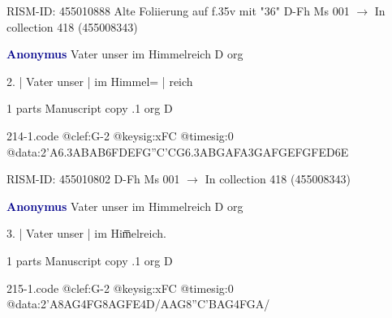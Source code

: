 \documentclass[twocolumn]{book}
\begin{document}
\newline RISM-ID: 455010888
\newline Alte Foliierung auf f.35v mit "36"
\newline D-Fh  Ms 001
\newline $\rightarrow$ In collection 418 (455008343)

\newline \par \vspace{7pt} \textcolor{darkblue}{\textbf{Anonymus  }}
\newline Vater unser im Himmelreich  D  
\newline org
\newline \begin{itshape}[f.2v, at left:] 2. | Vater unser | im Himmel= | reich\end{itshape} 
\newline \textcolor{darkblue}{}  1 parts  
\newline Manuscript copy
.1  org  D  
\begin{filecontents*}{214-1.code}
@clef:G-2
@keysig:xFC
@timesig:0
@data:2'A{6.3ABAB}{6FDEF}{G''C'CG}{6.3ABGA}{FA}{3GAFG}{EFGF}{ED6E}
\end{filecontents*}
\newline
%

\newline RISM-ID: 455010802
\newline D-Fh  Ms 001
\newline $\rightarrow$ In collection 418 (455008343)

\newline \par \vspace{7pt} \textcolor{darkblue}{\textbf{Anonymus  }}
\newline Vater unser im Himmelreich  D  
\newline org
\newline \begin{itshape}[f.4r, at left:] 3. | Vater unser | im Him̅elreich.\end{itshape} 
\newline \textcolor{darkblue}{}  1 parts  
\newline Manuscript copy
.1  org  D  
\begin{filecontents*}{215-1.code}
@clef:G-2
@keysig:xFC
@timesig:0
@data:2'A{8AG}4FG{8AG}{FE}4D/AAG{8''C'BAG}4FGA/
\end{filecontents*}
\newline
%
\end{document}
